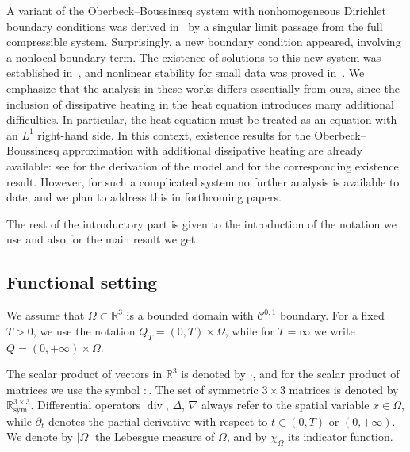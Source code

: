 \documentclass[11pt, a4paper, reqno]{amsart}
\numberwithin{equation}{section}
\newcommand{\diver}{\operatorname{div}}
\newcommand{\QT}{Q_T}
\begin{document}
A variant of the Oberbeck--Boussinesq system with nonhomogeneous Dirichlet boundary conditions was derived in~\cite{BeFeOsch2023} by a singular limit passage from the full compressible system. Surprisingly, a new boundary condition appeared, involving a nonlocal boundary term. The existence of solutions to this new system was established in~\cite{AbFe2023}, and nonlinear stability for small data was proved in~\cite{FeRoSchi2024}. We emphasize that the analysis in these works differs essentially from ours, since the inclusion of dissipative heating in the heat equation introduces many additional difficulties. In particular, the heat equation must be treated as an equation with an $L^1$ right-hand side.
In this context, existence results for the Oberbeck--Boussinesq approximation with additional dissipative heating are already available: see \cite{KaRuTha2000} for the derivation of the model and \cite{AbBuLe24} for the corresponding existence result. However, for such a complicated system no further analysis is available to date, and we plan to address this in forthcoming papers.



\bigskip
  
The rest of the introductory part is given to the introduction of the notation we use and also for the main result we get.



\subsection{Functional setting}

We assume that $\Omega \subset \mathbb{R}^3$ is a bounded domain with $\mathcal{C}^{0,1}$ boundary.  
For a fixed $T > 0$, we use the notation $\QT = (0,T)\times \Omega$, while for $T = \infty$ we write $Q = (0,+\infty)\times \Omega$.  

The scalar product of vectors in $\mathbb{R}^3$ is denoted by $\cdot$, and for the scalar product of matrices we use the symbol $:$.   The set of symmetric $3 \times 3$ matrices is denoted by $\mathbb{R}^{3 \times 3}_{\mathrm{sym}}$.  
Differential operators $\diver$, $\Delta$, $\nabla$ always refer to the spatial variable $x \in \Omega$, while $\partial_t$ denotes the partial derivative with respect to $t \in (0,T)$ or $(0,+\infty)$.  We denote by $|\Omega|$ the Lebesgue measure of $\Omega$, and by $\chi_\Omega$ its indicator function. 
\end{document}
